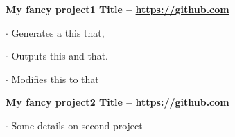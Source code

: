 \documentclass[11pt,english]{article}
\begin{document}
\begin{minipage}{\textwidth}


  
    {\small\bf My fancy project1 Title  -- \color{maincolor}\url{https://github.com}  }
    \vspace{1mm}
    
      $\cdot$ \small Generates a this that,
    
      $\cdot$ \small Outputs this and that.
    
      $\cdot$ \small Modifies this to that
    
    
    \vspace{3mm}
  
    {\small\bf My fancy project2 Title  -- \color{maincolor}\url{https://github.com}  }
    \vspace{1mm}
    
      $\cdot$ \small Some details on second project
    
    
    \vspace{3mm}
  
  \vspace{15mm}


\end{minipage}
\end{document}
